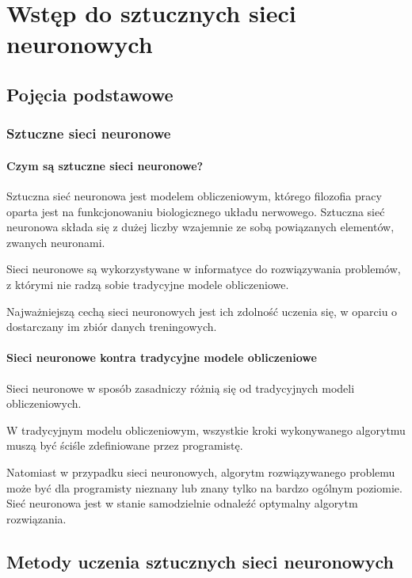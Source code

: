 \chapter{Wstęp do sztucznych sieci neuronowych}
\section{Pojęcia podstawowe}
\subsection{Sztuczne sieci neuronowe}
\subsubsection{Czym są sztuczne sieci neuronowe?}
Sztuczna sieć neuronowa jest modelem obliczeniowym, którego filozofia pracy oparta jest na funkcjonowaniu biologicznego układu nerwowego.
Sztuczna sieć neuronowa składa się z dużej liczby wzajemnie ze sobą powiązanych elementów, zwanych neuronami.

Sieci neuronowe są wykorzystywane w informatyce do rozwiązywania problemów, z którymi nie radzą sobie tradycyjne modele obliczeniowe.

Najważniejszą cechą sieci neuronowych jest ich zdolność uczenia się, w oparciu o dostarczany im zbiór danych treningowych.

\subsubsection{Sieci neuronowe kontra tradycyjne modele obliczeniowe}
Sieci neuronowe w sposób zasadniczy różnią się od tradycyjnych modeli obliczeniowych.
 
W tradycyjnym modelu obliczeniowym, wszystkie kroki wykonywanego algorytmu muszą być ściśle zdefiniowane przez programistę.

Natomiast w przypadku sieci neuronowych, algorytm rozwiązywanego problemu może być dla programisty nieznany lub znany tylko na bardzo ogólnym poziomie.
Sieć neuronowa jest w stanie samodzielnie odnaleźć optymalny algorytm rozwiązania.

\section{Metody uczenia sztucznych sieci neuronowych}